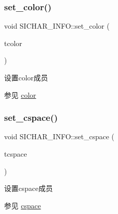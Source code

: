 \subsubsection{\texorpdfstring{set\+\_\+color()}{set\_color()}}
{\footnotesize\ttfamily void S\+I\+C\+H\+A\+R\+\_\+\+I\+N\+F\+O\+::set\+\_\+color (\begin{DoxyParamCaption}\item[{C\+O\+L\+O\+R\+E\+RF}]{tcolor }\end{DoxyParamCaption})\hspace{0.3cm}{\ttfamily [inline]}}



设置color成员 

\begin{DoxySeeAlso}{参见}
\hyperlink{class_s_i_c_h_a_r___i_n_f_o_ab9605aad10f9e033ed8e004468beeab9}{color} 
\end{DoxySeeAlso}
\mbox{\label{class_s_i_c_h_a_r___i_n_f_o_a18aaf35f07094cb42942663a71456227}} 
\subsubsection{\texorpdfstring{set\+\_\+cspace()}{set\_cspace()}}
{\footnotesize\ttfamily void S\+I\+C\+H\+A\+R\+\_\+\+I\+N\+F\+O\+::set\+\_\+cspace (\begin{DoxyParamCaption}\item[{C\+H\+A\+R\+S\+P\+A\+CE}]{tcspace }\end{DoxyParamCaption})\hspace{0.3cm}{\ttfamily [inline]}}



设置cspace成员 

\begin{DoxySeeAlso}{参见}
\hyperlink{class_s_i_c_h_a_r___i_n_f_o_a575d876eda778563dec0f72bd4bc06ea}{cspace} 
\end{DoxySeeAlso}
\mbox{\label{class_s_i_c_h_a_r___i_n_f_o_a7dd5af8833b1951a6e4759668d484f37}} 
